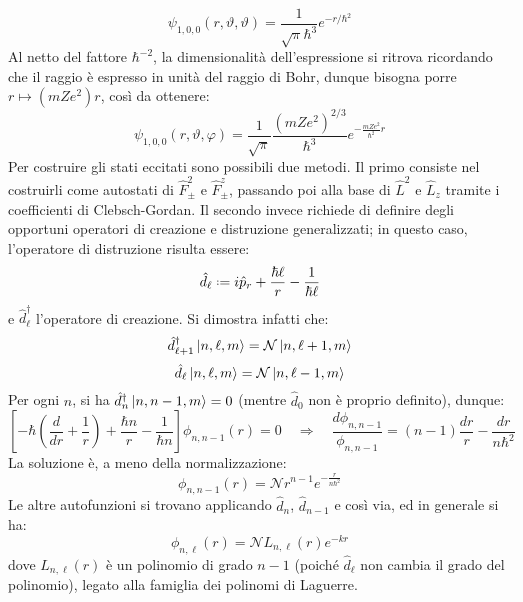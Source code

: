 \begin{equation}
	\psi_{1,0,0}(r,\vartheta,\vartheta) = \frac{1}{\sqrt{\pi}\hbar^3} e^{- r / \hbar^2}
	\label{eq:3.70}
\end{equation}
Al netto del fattore $ \hbar^{-2} $, la dimensionalità dell'espressione si ritrova ricordando che il raggio è espresso in unità del raggio di Bohr, dunque bisogna porre $ r \mapsto (mZe^2) r $, così da ottenere:
\begin{equation}
	\psi_{1,0,0}(r,\vartheta,\varphi) = \frac{1}{\sqrt{\pi}} \frac{\left( m Z e^2 \right)^{2/3}}{\hbar^3} e^{ -\frac{mZe^2}{\hbar^2} r }
	\label{eq:3.71}
\end{equation}
Per costruire gli stati eccitati sono possibili due metodi. Il primo consiste nel costruirli come autostati di $ \hat{F}_{\pm}^2 $ e $ \hat{F}_{\pm}^z $, passando poi alla base di $ \hat{L}^2 $ e $ \hat{L}_z $ tramite i coefficienti di Clebsch-Gordan. Il secondo invece richiede di definire degli opportuni operatori di creazione e distruzione generalizzati; in questo caso, l'operatore di distruzione risulta essere:
\begin{equation}
	\hat{d}_{\ell} \defeq i \hat{p}_r + \frac{\hbar \ell}{r} - \frac{1}{\hbar \ell}
	\label{eq:3.72}
\end{equation}
e $ \hat{d}_{\ell}^{\dagger} $ l'operatore di creazione. Si dimostra infatti che:
\begin{equation}
	\hat{d}_{\ell + 1}^{\dagger} \ket{n,\ell,m} = \mathcal{N} \ket{n,\ell+1,m}
	\label{eq:3.73}
\end{equation}
\begin{equation}
	\hat{d}_{\ell} \ket{n,\ell,m} = \mathcal{N} \ket{n,\ell-1,m}
	\label{eq:3.74}
\end{equation}
Per ogni $ n $, si ha $ \hat{d}_n^{\dagger}\ket{n,n-1,m} = 0 $ (mentre $ \hat{d}_0 $ non è proprio definito), dunque:
\begin{equation*}
	\left[ -\hbar \left( \frac{d}{dr} + \frac{1}{r} \right) + \frac{\hbar n}{r} - \frac{1}{\hbar n} \right] \phi_{n,n-1}(r) = 0
	\quad \Rightarrow \quad
	\frac{d\phi_{n,n-1}}{\phi_{n,n-1}} = (n-1) \frac{dr}{r} - \frac{dr}{n\hbar^2}
\end{equation*}
La soluzione è, a meno della normalizzazione:
\begin{equation*}
	\phi_{n,n-1}(r) = \mathcal{N} r^{n-1} e^{- \frac{r}{n\hbar^2}}
\end{equation*}
Le altre autofunzioni si trovano applicando $ \hat{d}_n $, $ \hat{d}_{n-1} $ e così via, ed in generale si ha:
\begin{equation}
	\phi_{n,\ell}(r) = \mathcal{N} L_{n,\ell}(r) e^{-kr}
	\label{eq:3.75}
\end{equation}
dove $ L_{n,\ell}(r) $ è un polinomio di grado $ n - 1 $ (poiché $ \hat{d}_{\ell} $ non cambia il grado del polinomio), legato alla famiglia dei polinomi di Laguerre.










